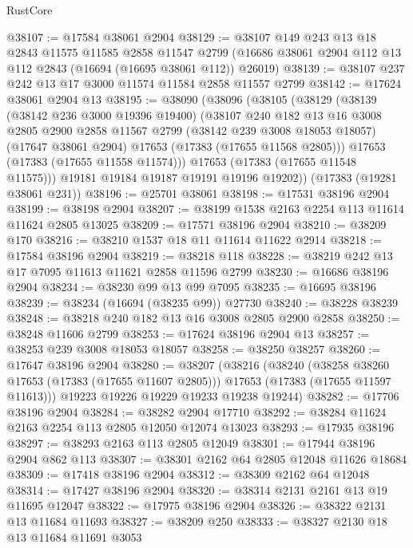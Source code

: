 \begin{lexlean}{RustCore}
\begin{coremodule}
@38107 := @17584 @38061 @2904
@38129 := @38107
    @149
    @243
    @13
    @18
    @2843
    @11575
    @11585
    @2858
    @11547
    @2799
    (@16686 @38061 @2904 @112 @13 @112 @2843 (@16694 (@16695 @38061 @112)) @26019)
@38139 := @38107 @237 @242 @13 @17 @3000 @11574 @11584 @2858 @11557 @2799
@38142 := @17624 @38061 @2904 @13
@38195 := @38090
    (@38096
      (@38105
        (@38129
          (@38139
            (@38142 @236 @3000 @19396 @19400)
            (@38107
              @240
              @182
              @13
              @16
              @3008
              @2805
              @2900
              @2858
              @11567
              @2799
              (@38142 @239 @3008 @18053 @18057)
              (@17647 @38061 @2904)
              @17653
              (@17383 (@17655 @11568 @2805)))
            @17653
            (@17383 (@17655 @11558 @11574)))
          @17653
          (@17383 (@17655 @11548 @11575)))
        @19181
        @19184
        @19187
        @19191
        @19196
        @19202))
    (@17383 (@19281 @38061 @231))
@38196 := @25701 @38061
@38198 := @17531 @38196 @2904
@38199 := @38198 @2904
@38207 := @38199 @1538 @2163 @2254 @113 @11614 @11624 @2805 @13025
@38209 := @17571 @38196 @2904
@38210 := @38209 @170
@38216 := @38210 @1537 @18 @11 @11614 @11622 @2914
@38218 := @17584 @38196 @2904
@38219 := @38218 @118
@38228 := @38219 @242 @13 @17 @7095 @11613 @11621 @2858 @11596 @2799
@38230 := @16686 @38196 @2904
@38234 := @38230 @99 @13 @99 @7095
@38235 := @16695 @38196
@38239 := @38234 (@16694 (@38235 @99)) @27730
@38240 := @38228 @38239
@38248 := @38218 @240 @182 @13 @16 @3008 @2805 @2900 @2858
@38250 := @38248 @11606 @2799
@38253 := @17624 @38196 @2904 @13
@38257 := @38253 @239 @3008 @18053 @18057
@38258 := @38250 @38257
@38260 := @17647 @38196 @2904
@38280 := @38207
    (@38216
      (@38240
        (@38258 @38260 @17653 (@17383 (@17655 @11607 @2805)))
        @17653
        (@17383 (@17655 @11597 @11613)))
      @19223
      @19226
      @19229
      @19233
      @19238
      @19244)
@38282 := @17706 @38196 @2904
@38284 := @38282 @2904 @17710
@38292 := @38284 @11624 @2163 @2254 @113 @2805 @12050 @12074 @13023
@38293 := @17935 @38196
@38297 := @38293 @2163 @113 @2805 @12049
@38301 := @17944 @38196 @2904 @862 @113
@38307 := @38301 @2162 @64 @2805 @12048 @11626 @18684
@38309 := @17418 @38196 @2904
@38312 := @38309 @2162 @64 @12048
@38314 := @17427 @38196 @2904
@38320 := @38314 @2131 @2161 @13 @19 @11695 @12047
@38322 := @17975 @38196 @2904
@38326 := @38322 @2131 @13 @11684 @11693
@38327 := @38209 @250
@38333 := @38327 @2130 @18 @13 @11684 @11691 @3053

\end{coremodule}
\end{lexlean}
